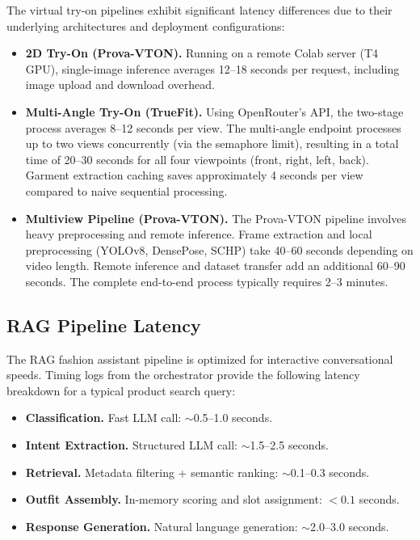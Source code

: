 The virtual try-on pipelines exhibit significant latency differences due to their underlying architectures and deployment configurations:

\begin{itemize}[leftmargin=*]
    \item \textbf{2D Try-On (Prova-VTON).} Running on a remote Colab server (T4 GPU), single-image inference averages 12--18 seconds per request, including image upload and download overhead.
    \item \textbf{Multi-Angle Try-On (TrueFit).} Using OpenRouter's API, the two-stage process averages 8--12 seconds per view. The multi-angle endpoint processes up to two views concurrently (via the semaphore limit), resulting in a total time of 20--30 seconds for all four viewpoints (front, right, left, back). Garment extraction caching saves approximately 4 seconds per view compared to naive sequential processing.
    \item \textbf{Multiview Pipeline (Prova-VTON).} The Prova-VTON pipeline involves heavy preprocessing and remote inference. Frame extraction and local preprocessing (YOLOv8, DensePose, SCHP) take 40--60 seconds depending on video length. Remote inference and dataset transfer add an additional 60--90 seconds. The complete end-to-end process typically requires 2--3 minutes.
\end{itemize}

\subsection{RAG Pipeline Latency}

The RAG fashion assistant pipeline is optimized for interactive conversational speeds. Timing logs from the orchestrator provide the following latency breakdown for a typical product search query:

\begin{itemize}[leftmargin=*]
    \item \textbf{Classification.} Fast LLM call: $\sim$0.5--1.0 seconds.
    \item \textbf{Intent Extraction.} Structured LLM call: $\sim$1.5--2.5 seconds.
    \item \textbf{Retrieval.} Metadata filtering + semantic ranking: $\sim$0.1--0.3 seconds.
    \item \textbf{Outfit Assembly.} In-memory scoring and slot assignment: $<0.1$ seconds.
    \item \textbf{Response Generation.} Natural language generation: $\sim$2.0--3.0 seconds.
\end{itemize}

